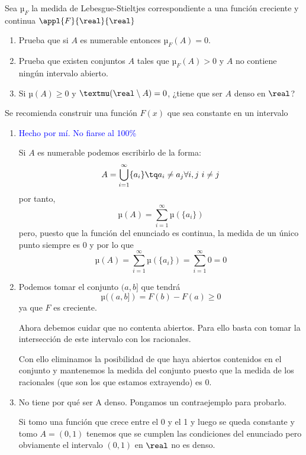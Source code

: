 \begin{problem}
Sea $µ_F$ la medida de Lebesgue-Stieltjes correspondiente a una función creciente y continua $\appl{F}{\real}{\real}$
\begin{enumerate}
\item Prueba que si $A$ es numerable entonces $µ_F(A)=0$.
\item Prueba que existen conjuntos $A$ tales que $µ_F(A)> 0$ y $A$ no contiene ningún intervalo abierto.
\item Si $µ(A)\geq 0$ y $µ(\real \setminus A) = 0$, ¿tiene que ser $A$ denso en $\real$?
\end{enumerate}
\obs Se recomienda construir una función $F(x)$ que sea constante en un intervalo
\solution

\begin{enumerate}
\item \textcolor{blue}{Hecho por mí. No fiarse al 100\%}

Si $A$ es numerable podemos escribirlo de la forma:
\[A = \bigcup_{i=1}^{\infty}\{a_i\} \tq a_i \neq a_j \forall i, j \ i \neq j\]
por tanto,
\[µ(A) = \sum_{i=1}^{\infty} µ(\{a_i\}) \]
pero, puesto que la función del enunciado es continua, la medida de un único punto siempre es 0 y por lo que
\[µ(A) = \sum_{i=1}^{\infty} µ(\{a_i\}) = \sum_{i=1}^{\infty}  0 = 0\]

\item Podemos tomar el conjunto $(a, b]$ que tendrá
\[µ((a,b]) = F(b)-F(a) \geq 0\]
ya que $F$ es creciente.

Ahora debemos cuidar que no contenta abiertos. Para ello basta con tomar la intersección de este intervalo con los racionales.

Con ello eliminamos la posibilidad de que haya abiertos contenidos en el conjunto y mantenemos la medida del conjunto puesto que la medida de los racionales (que son los que estamos extrayendo) es 0.

\item No tiene por qué ser A denso. Pongamos un contraejemplo para probarlo.

Si tomo una función que crece entre el 0 y el 1 y luego se queda constante y tomo $A=(0,1)$ tenemos que se cumplen las condiciones del enunciado pero obviamente el intervalo $(0,1)$ en $\real$ no es denso.
\end{enumerate}
\end{problem}

